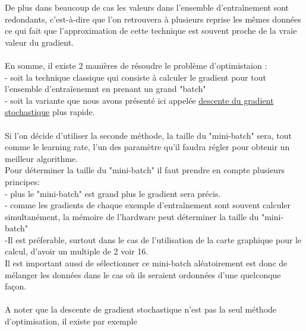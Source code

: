 \documentclass[openany,14pt,fleqn]{book} %
\begin{document}
De plus dans beaucoup de cas les valeurs dans l'ensemble d'entraînement sont redondants, c'est-à-dire que l'on retrouvera à plusieurs reprise les mêmes données ce qui fait que l'approximation de cette technique est souvent proche de la vraie valeur du gradient.\\ \\
En somme, il existe 2 manières de résoudre le problème d'optimistaion :\\ - soit la technique classique qui consiste à calculer le gradient pour tout l'ensemble d'entraîenemnt en prenant un grand "batch"\\ - soit la variante que nous avons présenté ici appelée \underline {descente du gradient stochastique} plus rapide.\\ \\
Si l'on décide d'utiliser la seconde méthode, la taille du "mini-batch" sera, tout comme le learning rate, l'un des paramètre qu'il faudra régler pour obtenir un meilleur algorithme.\\
Pour déterminer la taille du "mini-batch" il faut prendre en compte plusieurs principes:\\ - plus le "mini-batch" est grand plus le gradient sera précis. \\ - comme les gradients de chaque exemple d'entraînement sont souvent calculer simultanément, la mémoire de l'hardware peut déterminer la taille du "mini-batch"\\ -Il est préferable, surtout dans le cas de l'utilisation de la carte graphique pour le calcul, d'avoir un multiple de 2 voir 16.\cite{Deep}\\
Il est important aussi de sélectionner ce mini-batch aléatoirement est donc de mélanger les données dans le cas où ils seraient ordonnées d'une quelconque façon.\\ \\
A noter que la descente de gradient stochastique n'est pas la seul méthode d'optimisation, il existe par exemple 
\end{document}
